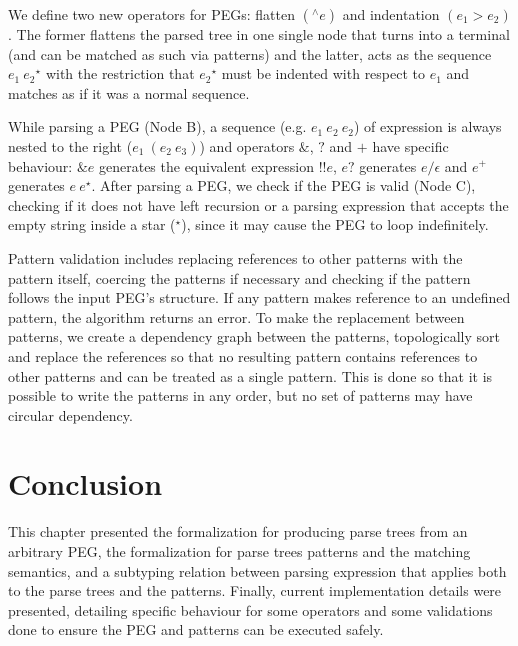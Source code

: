 We define two new operators for PEGs: flatten \((^\wedge e)\) and indentation
\((e_1 > e_2)\). The former flattens the parsed tree in one single node that turns
into a terminal (and can be matched as such via patterns) and the latter, acts as 
the sequence \(e_1\:{e_2}^\star\) with the restriction that \({e_2}^\star\) must 
be indented with respect to \(e_1\) and matches as if it was a normal sequence.

While parsing a PEG (Node B), a sequence (e.g. \(e_1\:e_2\:e_2\)) of expression 
is always nested to the right (\(e_1\:(e_2\:e_3)\)) and operators \(\&\), \(?\) 
and \(+\) have specific behaviour: \(\&e\) generates the equivalent expression 
\(!!e\), \(e?\) generates \(e / \epsilon\) and \(e^+\) generates \(e \: e^\star\).
After parsing a PEG, we check if the PEG is valid (Node C), checking if it does 
not have left recursion or a parsing expression that accepts the empty string 
inside a star (\(^\star\)), since it may cause the PEG to loop indefinitely.

Pattern validation includes replacing references to other patterns with the
pattern itself, coercing the patterns if necessary and checking if the pattern 
follows the input PEG's structure. If any pattern makes reference to an undefined
pattern, the algorithm returns an error. To make the replacement between patterns, 
we create a dependency graph between the patterns, topologically sort and replace 
the references so that no resulting pattern contains references to other patterns 
and can be treated as a single pattern. This is done so that it is possible to write 
the patterns in any order, but no set of patterns may have circular dependency.

\section{Conclusion}\label{sec:methodology-conclusion}

This chapter presented the formalization for producing parse trees from an arbitrary
PEG, the formalization for parse trees patterns and the matching semantics, and 
a subtyping relation between parsing expression that applies both to the parse 
trees and the patterns. Finally, current implementation details were presented,
detailing specific behaviour for some operators and some validations done to 
ensure the PEG and patterns can be executed safely.

\cleardoublepage
